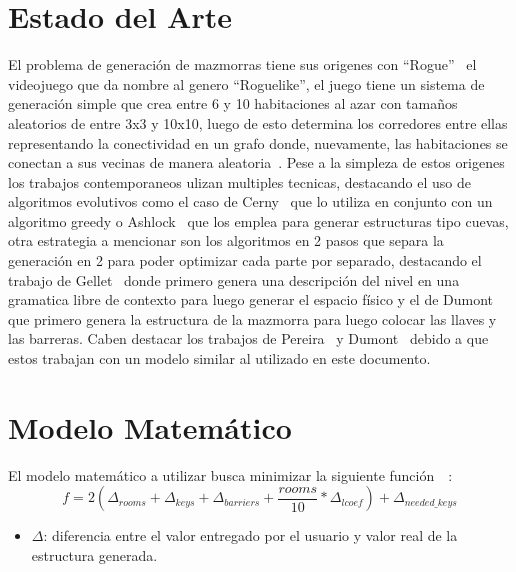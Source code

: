 \documentclass[letter, 10pt]{article}
\begin{document}
\section{Estado del Arte}

El problema de generaci\'on de mazmorras tiene sus origenes con ``Rogue''~\cite{rogue} el videojuego que da nombre al genero ``Roguelike'', el juego tiene un sistema de generaci\'on simple que crea entre 6 y 10 habitaciones al azar con tama\~nos aleatorios de entre 3x3 y 10x10, luego de esto determina los corredores entre ellas representando la conectividad en un grafo donde,  nuevamente, las habitaciones se conectan a sus vecinas de manera aleatoria~\cite{roguecode}. Pese a la simpleza de estos origenes los trabajos contemporaneos ulizan multiples tecnicas, destacando el uso de algoritmos evolutivos como el caso de Cerny~\cite{CernyEA} que lo utiliza en conjunto con un algoritmo greedy o Ashlock~\cite{AshlockEA} que los emplea para generar estructuras tipo cuevas, otra estrategia a mencionar son los algoritmos en 2 pasos que separa la generaci\'on en 2 para poder optimizar cada parte por separado, destacando el trabajo de Gellet~\cite{Gellethybrid} donde primero genera una descripci\'on del nivel en una gramatica libre de contexto para luego generar el espacio f\'isico y el de Dumont~\cite{2stepEA} que primero genera la estructura de la mazmorra para luego colocar las llaves y las barreras. Caben destacar los trabajos de Pereira~\cite{pgdm} y Dumont~\cite{2stepEA} debido a que estos trabajan con un modelo similar al utilizado en este documento.



\section{Modelo Matem\'atico}

El modelo matem\'atico a utilizar busca minimizar la siguiente funci\'on~\cite{2stepEA}~\cite{pgdm}:
$$f = 2( \Delta_{rooms} + \Delta_{keys} + \Delta_{barriers} + \frac{rooms}{10} * \Delta_{lcoef}) + \Delta_{needed\_keys}$$
\begin{itemize}
    \item $\Delta$: diferencia entre el valor entregado por el usuario y valor real de la estructura generada.
\end{itemize}
\end{document}
